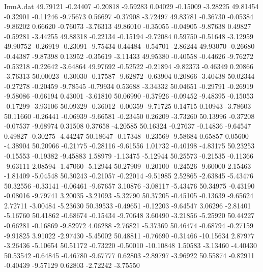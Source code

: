 \begin{filecontents}{ImuA.dat}
  49.79121   -0.24407   -0.20818   -9.59283    0.04029   -0.15009   -3.28225
  49.81454   -0.32901   -0.11246   -9.75673    0.56697   -0.37908   -3.72497
  49.83781   -0.36730   -0.05384   -9.86202    0.66620   -0.76073   -3.76313
  49.86010   -0.35055   -0.04905   -9.87638    0.49827   -0.59281   -3.44255
  49.88318   -0.22134   -0.15194   -9.72084    0.59750   -0.51648   -3.12959
  49.90752   -0.26919   -0.23091   -9.75434    0.44484   -0.54701   -2.86244
  49.93070   -0.26680   -0.44387   -9.87398    0.13952   -0.35619   -3.11433
  49.95380   -0.40558   -0.44626   -9.76272   -0.53218   -0.22642   -3.64864
  49.97692   -0.52522   -0.21894   -9.82373   -0.46349    0.20866   -3.76313
  50.00023   -0.30030   -0.17587   -9.62872   -0.63904    0.20866   -3.40438
  50.02344   -0.27278   -0.20459   -9.78545   -0.79934    0.53688   -3.34332
  50.04651   -0.29791   -0.26919   -9.58086   -0.66194    0.43001   -3.61810
  50.06990   -0.37926   -0.09452   -9.48395   -0.15053   -0.17299   -3.93106
  50.09329   -0.36012   -0.00359   -9.71725    0.14715    0.10943   -3.78603
  50.11660   -0.26441   -0.06939   -9.66581   -0.23450    0.26209   -3.73260
  50.13996   -0.37208   -0.07537   -9.68974    0.31508    0.37658   -4.20585
  50.16324   -0.27637   -0.14836   -9.64547    0.49827   -0.30275   -4.44247
  50.18647   -0.17348   -0.23569   -9.58684    0.65857    0.05600   -4.38904
  50.20966   -0.21775   -0.28116   -9.61556    1.01732   -0.40198   -4.83175
  50.23253   -0.15553   -0.19382   -9.45883    1.58979   -1.13475   -5.12944
  50.25573   -0.21535   -0.11366   -9.63111    2.08594   -1.47060   -5.12944
  50.27909   -0.20100   -0.24526   -9.60000    2.15463   -1.81409   -5.04548
  50.30243   -0.21057   -0.22014   -9.51985    2.52865   -2.63845   -5.43476
  50.32556   -0.33141   -0.06461   -9.67657    3.10876   -3.08117   -5.43476
  50.34975   -0.43190   -0.08016   -9.79741    3.20035   -3.21093   -5.32790
  50.37205   -0.45105   -0.13639   -9.65624    2.72711   -3.00484   -5.23630
  50.39533   -0.49651   -0.12203   -9.64547    3.06296   -2.81401   -5.16760
  50.41862   -0.68674   -0.15434   -9.70648    3.60490   -3.21856   -5.25920
  50.44227   -0.66281   -0.16869   -9.82972    4.06288   -2.76821   -5.37369
  50.46474   -0.68794   -0.27159   -9.91825    3.91022   -2.97430   -5.45002
  50.48811   -0.76690   -0.31466  -10.15634    2.87977   -3.26436   -5.10654
  50.51172   -0.73220   -0.50010  -10.10848    1.50583   -3.13460   -4.40430
  50.53542   -0.64845   -0.46780   -9.67777    0.62803   -2.89797   -3.96922
  50.55874   -0.82911   -0.40439   -9.57129    0.62803   -2.72242   -3.75550

\end{filecontents}
